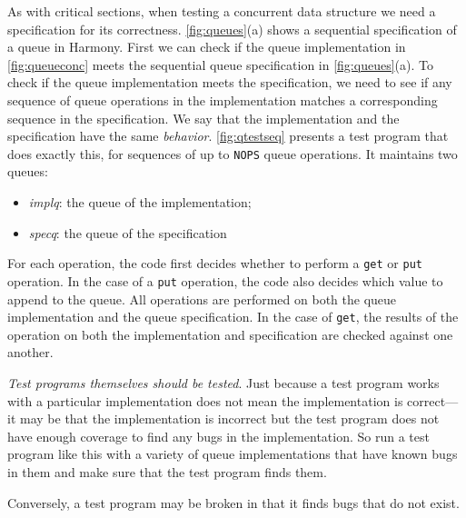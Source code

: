 \documentclass{report}
\begin{document}
As with critical sections, when testing a concurrent data structure
we need a specification for its correctness.
\autoref{fig:queues}(a) shows a sequential specification of a
queue in Harmony.
First we can check if the queue implementation
in \autoref{fig:queueconc} meets the sequential
queue specification in \autoref{fig:queues}(a).
To check if the queue implementation meets the specification,
we need to see if any sequence of queue operations in the
implementation matches a corresponding sequence in the
specification.
We say that the implementation and the specification
have the same \emph{behavior}.
%
\autoref{fig:qtestseq} presents a test program that does
exactly this, for sequences of up to \texttt{NOPS}
queue operations.
It maintains two queues:
\begin{itemize}
\item[] \textit{implq}: the queue of the implementation;
\item[] \textit{specq}: the queue of the specification
\end{itemize}
For each operation, the code first decides whether to
perform a \texttt{get} or \texttt{put} operation.
In the case of a \texttt{put} operation, the code also
decides which value to append to the queue.
All operations are performed on both the queue implementation
and the queue specification.
In the case of \texttt{get}, the results of the operation
on both the implementation and specification are checked against one another.

\emph{Test programs themselves should be tested}.
Just because a test program works with a particular implementation
does not mean the implementation is correct---it may be that the implementation
is incorrect but the test program does not have enough coverage to find any
bugs in the implementation.
So run a test program like this with a variety of queue implementations that
have known bugs in them and make sure that the test program finds them.

Conversely, a test program may be broken in that it finds bugs that do not exist.

\end{document}
